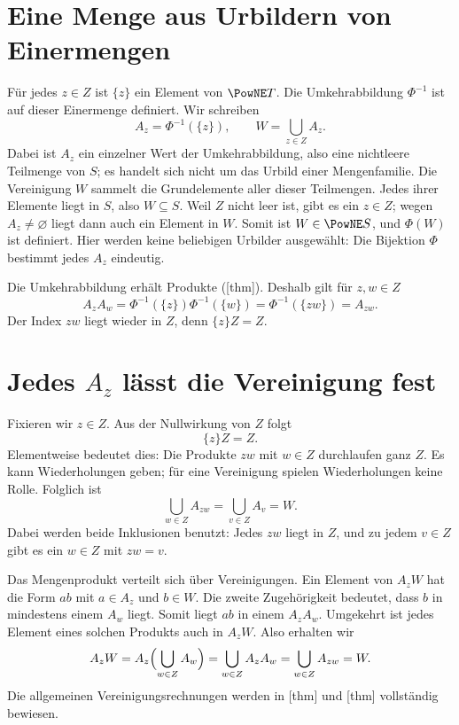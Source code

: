 \section{Eine Menge aus Urbildern von Einermengen}

Für jedes \(z\in Z\) ist \(\{z\}\) ein Element von \(\PowNE T\).
Die Umkehrabbildung \(\Phi^{-1}\) ist auf dieser Einermenge definiert.
Wir schreiben
\[
 A_z=\Phi^{-1}(\{z\}),\qquad
 W=\bigcup_{z\in Z}A_z.
\]
Dabei ist \(A_z\) ein einzelner Wert der Umkehrabbildung, also eine
nichtleere Teilmenge von \(S\); es handelt sich nicht um das Urbild
einer Mengenfamilie. Die Vereinigung \(W\) sammelt die Grundelemente
aller dieser Teilmengen. Jedes ihrer Elemente liegt in \(S\), also
\(W\subseteq S\). Weil \(Z\) nicht leer ist, gibt es ein \(z\in Z\);
wegen \(A_z\neq\varnothing\) liegt dann auch ein Element in \(W\).
Somit ist \(W\in\PowNE S\), und \(\Phi(W)\) ist definiert.
Hier werden keine beliebigen Urbilder ausgewählt: Die Bijektion
\(\Phi\) bestimmt jedes \(A_z\) eindeutig.

Die Umkehrabbildung erhält Produkte
([thm]). Deshalb gilt
für \(z,w\in Z\)
\[
 A_zA_w
 =\Phi^{-1}(\{z\})\Phi^{-1}(\{w\})
 =\Phi^{-1}(\{zw\})=A_{zw}.
\]
Der Index \(zw\) liegt wieder in \(Z\), denn
\(\{z\}Z=Z\).

\section{Jedes \texorpdfstring{\(A_z\)}{Az} lässt die Vereinigung fest}

Fixieren wir \(z\in Z\). Aus der Nullwirkung von \(Z\) folgt
\[
 \{z\}Z=Z.
\]
Elementweise bedeutet dies: Die Produkte \(zw\) mit \(w\in Z\)
durchlaufen ganz \(Z\). Es kann Wiederholungen geben; für eine
Vereinigung spielen Wiederholungen keine Rolle. Folglich ist
\[
 \bigcup_{w\in Z}A_{zw}=\bigcup_{v\in Z}A_v=W.
\]
Dabei werden beide Inklusionen benutzt: Jedes \(zw\) liegt in \(Z\),
und zu jedem \(v\in Z\) gibt es ein \(w\in Z\) mit \(zw=v\).

Das Mengenprodukt verteilt sich über Vereinigungen. Ein Element von
\(A_zW\) hat die Form \(ab\) mit \(a\in A_z\) und \(b\in W\).
Die zweite Zugehörigkeit bedeutet, dass \(b\) in mindestens einem
\(A_w\) liegt. Somit liegt \(ab\) in einem \(A_zA_w\).
Umgekehrt ist jedes Element eines solchen Produkts auch in \(A_zW\).
Also erhalten wir
\[
 A_zW
 =A_z\Bigl(\bigcup_{w\in Z}A_w\Bigr)
 =\bigcup_{w\in Z}A_zA_w
 =\bigcup_{w\in Z}A_{zw}=W.
\]
Die allgemeinen Vereinigungsrechnungen werden in
[thm] und
[thm] vollständig bewiesen.


